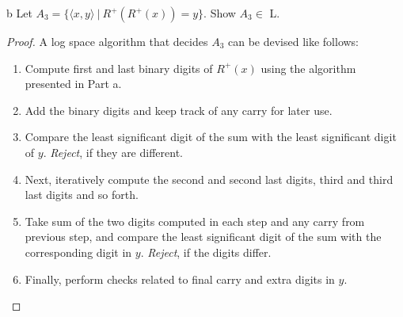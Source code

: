 \documentclass[11pt]{article}
\begin{document}
\newpage

\begin{problem}[Part]{b}
Let $A_3 = \{\langle x, y \rangle \ | \ R^+(R^+(x)) = y\}$. Show $A_3 \in$ L.
\end{problem}

\begin{proof}
A log space algorithm that decides $A_3$ can be devised like follows:
\begin{enumerate}
\item Compute first and last binary digits of $R^+(x)$ using the algorithm presented in Part a.
\item Add the binary digits and keep track of any carry for later use.
\item Compare the least significant digit of the sum with the least significant digit of $y$. \textit{Reject}, if they are different.
\item Next, iteratively compute the second and second last digits, third and third last digits and so forth.
\item Take sum of the two digits computed in each step and any carry from previous step, and compare the least significant digit of the sum  with the corresponding digit in $y$. \textit{Reject}, if the digits differ.
\item Finally, perform checks related to final carry and extra digits in $y$.
\end{enumerate}
 
\end{proof}
\end{document}
